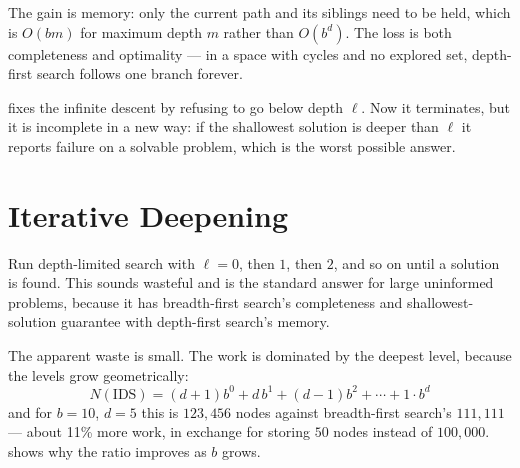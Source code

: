 The gain is memory: only the current path and its siblings need to be held, which
is $O(bm)$ for maximum depth $m$ rather than $O(b^{d})$. The loss is both
completeness and optimality --- in a space with cycles and no explored set,
depth-first search follows one branch forever.

 fixes the infinite descent by refusing to go below
depth $\ell$. Now it terminates, but it is incomplete in a new way: if the shallowest
solution is deeper than $\ell$ it reports failure on a solvable problem, which is
the worst possible answer.

\section{Iterative Deepening}

Run depth-limited search with $\ell = 0$, then $1$, then $2$, and so on until a
solution is found. This sounds wasteful and is the standard answer for large
uninformed problems, because it has breadth-first search's completeness and
shallowest-solution guarantee with depth-first search's memory.

The apparent waste is small. The work is dominated by the deepest level, because
the levels grow geometrically:
\[
  N(\text{IDS}) = (d+1)b^{0} + d\,b^{1} + (d-1)b^{2} + \cdots + 1\cdot b^{d}
\]
and for $b = 10$, $d = 5$ this is $123{,}456$ nodes against breadth-first search's
$111{,}111$ --- about 11\% more work, in exchange for storing $50$ nodes instead of
$100{,}000$.  shows why the ratio improves as $b$ grows.

